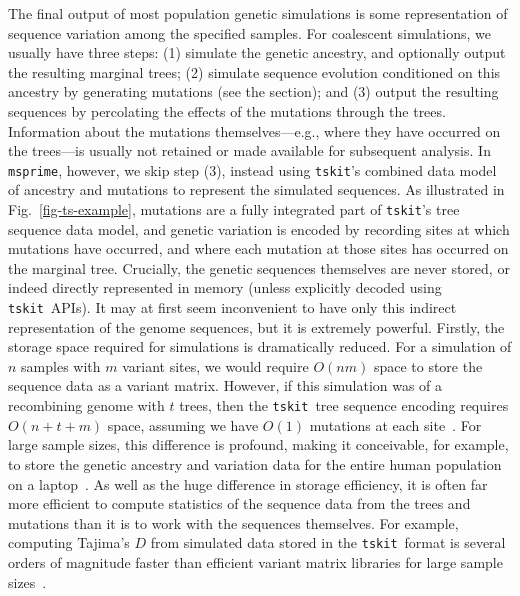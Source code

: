 \documentclass{article}
\newcommand{\msprime}[0]{\texttt{msprime}}
\newcommand{\tskit}[0]{\texttt{tskit}}
\begin{document}
The final output of most population genetic simulations is some representation
of sequence variation among the specified samples. For coalescent
simulations, we usually have three steps: (1) simulate
the genetic ancestry, and optionally output the resulting marginal trees;
(2) simulate sequence evolution conditioned on this ancestry by generating
mutations (see the  section); and (3) output the
resulting sequences by percolating the effects of the mutations through
the trees. Information about the mutations
themselves---e.g., where they have occurred on the
trees---is usually not retained or made available for subsequent analysis.
In \msprime, however, we skip step (3), instead using \tskit's
combined data model of ancestry and mutations
to represent the simulated sequences.
As illustrated in Fig.~\ref{fig-ts-example}, mutations are a
fully integrated part of \tskit's tree sequence data model, and genetic
variation is encoded by recording sites at which mutations
have occurred, and where each mutation at those sites
has occurred on the marginal tree.
Crucially, the genetic sequences themselves are never stored, or indeed directly
represented in memory (unless explicitly decoded using \tskit\ APIs).
It may at first seem inconvenient to have only this indirect representation
of the genome sequences, but it is extremely powerful.
Firstly, the storage space required for simulations is dramatically
reduced. For a simulation of $n$ samples with $m$ variant sites,
we would require $O(nm)$ space to store the sequence data as a variant
matrix. However, if this simulation was of a recombining genome
with $t$ trees, then the \tskit\ tree sequence encoding
requires $O(n + t + m)$ space,
assuming we have $O(1)$ mutations at each site~\citep{kelleher2016efficient}.
For large sample sizes, this difference is profound, making it
conceivable, for example, to store the genetic ancestry
and variation data for the entire human population on a
laptop~\citep{kelleher2019inferring}. As well as the huge
difference in storage efficiency, it is often far more efficient
to compute statistics of the sequence data from the
trees and mutations than it is to work with the sequences themselves.
For example, computing Tajima's $D$ from simulated data stored in the \tskit\ format
is several orders of magnitude faster than efficient variant matrix
libraries for large sample sizes~\citep{ralph2020efficiently}.
\end{document}
